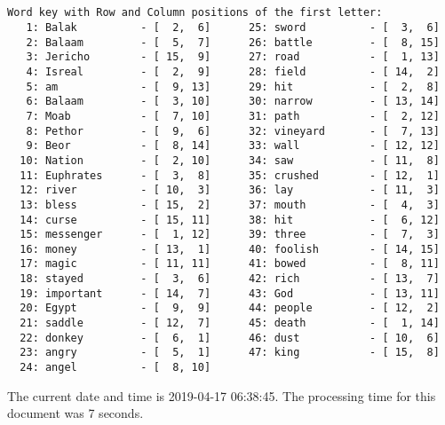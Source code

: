 \documentclass[12pt,a4paper,article]{memoir}\usepackage[]{graphicx}\usepackage[]{color}
\begin{document}
\clearpage
\begin{verbatim}


Word key with Row and Column positions of the first letter:
   1: Balak          - [  2,  6]      25: sword          - [  3,  6]
   2: Balaam         - [  5,  7]      26: battle         - [  8, 15]
   3: Jericho        - [ 15,  9]      27: road           - [  1, 13]
   4: Isreal         - [  2,  9]      28: field          - [ 14,  2]
   5: am             - [  9, 13]      29: hit            - [  2,  8]
   6: Balaam         - [  3, 10]      30: narrow         - [ 13, 14]
   7: Moab           - [  7, 10]      31: path           - [  2, 12]
   8: Pethor         - [  9,  6]      32: vineyard       - [  7, 13]
   9: Beor           - [  8, 14]      33: wall           - [ 12, 12]
  10: Nation         - [  2, 10]      34: saw            - [ 11,  8]
  11: Euphrates      - [  3,  8]      35: crushed        - [ 12,  1]
  12: river          - [ 10,  3]      36: lay            - [ 11,  3]
  13: bless          - [ 15,  2]      37: mouth          - [  4,  3]
  14: curse          - [ 15, 11]      38: hit            - [  6, 12]
  15: messenger      - [  1, 12]      39: three          - [  7,  3]
  16: money          - [ 13,  1]      40: foolish        - [ 14, 15]
  17: magic          - [ 11, 11]      41: bowed          - [  8, 11]
  18: stayed         - [  3,  6]      42: rich           - [ 13,  7]
  19: important      - [ 14,  7]      43: God            - [ 13, 11]
  20: Egypt          - [  9,  9]      44: people         - [ 12,  2]
  21: saddle         - [ 12,  7]      45: death          - [  1, 14]
  22: donkey         - [  6,  1]      46: dust           - [ 10,  6]
  23: angry          - [  5,  1]      47: king           - [ 15,  8]
  24: angel          - [  8, 10]

\end{verbatim}

\clearpage
The current date and time is 2019-04-17 06:38:45. The processing time for
this document was 7 seconds.
\end{document}
